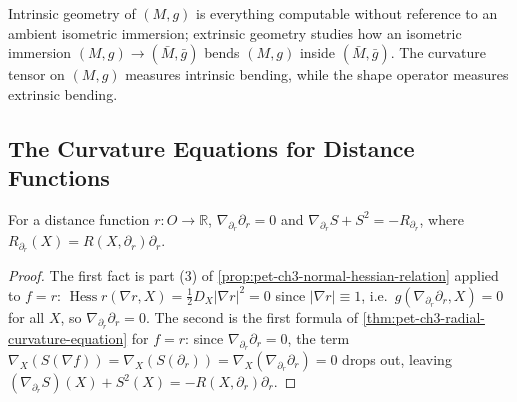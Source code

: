 \begin{remark}
  \label{rem:pet-ch3-intrinsic-extrinsic}
  \leanok
  Intrinsic geometry of $(M,g)$ is everything computable without reference to an
  ambient isometric immersion; extrinsic geometry studies how an isometric
  immersion $(M,g)\to(\bar M,\bar g)$ bends $(M,g)$ inside $(\bar M,\bar g)$. The
  curvature tensor on $(M,g)$ measures intrinsic bending, while the shape
  operator measures extrinsic bending.
\end{remark}

\subsection{The Curvature Equations for Distance Functions}

\begin{corollary}[Corollary 3.2.10]
  \label{cor:pet-ch3-radial-equation-distance-function}
  \leanok
  For a distance function $r:O\to\mathbb R$, $\nabla_{\partial_r}\partial_r=0$ and
  $\nabla_{\partial_r}S+S^2=-R_{\partial_r}$, where $R_{\partial_r}(X)=R(X,\partial_r)\partial_r$.
\end{corollary}
\begin{proof}
  \leanok
  The first fact is part (3) of \cref{prop:pet-ch3-normal-hessian-relation}
  applied to $f=r$: $\operatorname{Hess}r(\nabla r,X)=\tfrac12D_X|\nabla r|^2=0$
  since $|\nabla r|\equiv1$, i.e.\ $g(\nabla_{\partial_r}\partial_r,X)=0$ for all
  $X$, so $\nabla_{\partial_r}\partial_r=0$. The second is the first formula of
  \cref{thm:pet-ch3-radial-curvature-equation} for $f=r$: since
  $\nabla_{\partial_r}\partial_r=0$, the term
  $\nabla_X(S(\nabla f))=\nabla_X(S(\partial_r))=\nabla_X(\nabla_{\partial_r}\partial_r)=0$
  drops out, leaving $(\nabla_{\partial_r}S)(X)+S^2(X)=-R(X,\partial_r)\partial_r$.
\end{proof}

